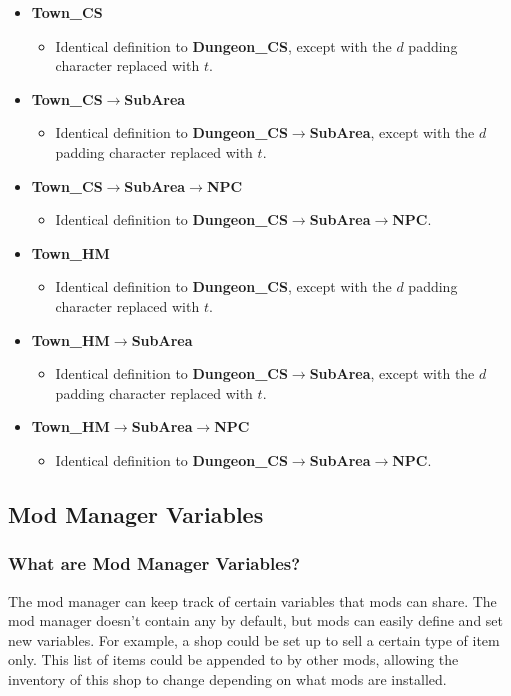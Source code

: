 \documentclass{article}
\begin{document}
\begin{itemize}
	
	\item \textbf{Town\_CS}
	\begin{itemize}
		\item Identical definition to \textbf{Dungeon\_CS}, except with the $d$ padding character replaced with $t$.
	\end{itemize}
	\item \textbf{Town\_CS}$\rightarrow$\textbf{SubArea}
	\begin{itemize}
		\item Identical definition to \textbf{Dungeon\_CS}$\rightarrow$\textbf{SubArea}, except with the $d$ padding character replaced with $t$.
	\end{itemize}
	\item \textbf{Town\_CS}$\rightarrow$\textbf{SubArea}$\rightarrow$\textbf{NPC}
	\begin{itemize}
		\item Identical definition to \textbf{Dungeon\_CS}$\rightarrow$\textbf{SubArea}$\rightarrow$\textbf{NPC}.
	\end{itemize}
	\item \textbf{Town\_HM}
	\begin{itemize}
		\item Identical definition to \textbf{Dungeon\_CS}, except with the $d$ padding character replaced with $t$.
	\end{itemize}
	\item \textbf{Town\_HM}$\rightarrow$\textbf{SubArea}
	\begin{itemize}
		\item Identical definition to \textbf{Dungeon\_CS}$\rightarrow$\textbf{SubArea}, except with the $d$ padding character replaced with $t$.
	\end{itemize}
	\item \textbf{Town\_HM}$\rightarrow$\textbf{SubArea}$\rightarrow$\textbf{NPC}
	\begin{itemize}
		\item Identical definition to \textbf{Dungeon\_CS}$\rightarrow$\textbf{SubArea}$\rightarrow$\textbf{NPC}.
	\end{itemize}
	
\end{itemize}
\newpage
\subsection{Mod Manager Variables}
\subsubsection{What are Mod Manager Variables?}
The mod manager can keep track of certain variables that mods can share. The mod manager doesn't contain any by default, but mods can easily define and set new variables. For example, a shop could be set up to sell a certain type of item only. This list of items could be appended to by other mods, allowing the inventory of this shop to change depending on what mods are installed.
\end{document}
